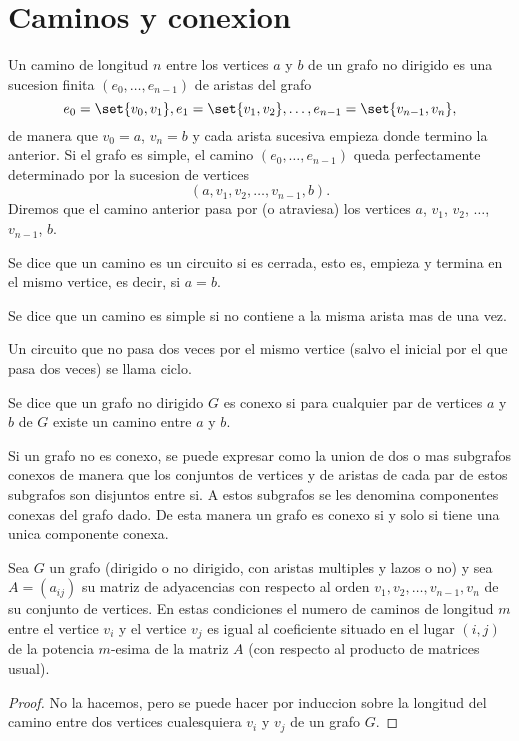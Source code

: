 \section{Caminos y conexion}
\begin{definition}[Camino]
	Un camino de longitud \(n \) entre los vertices \(a \) y \(b \) de un grafo no dirigido es una sucesion finita \((e_0, \ldots, e_{n-1})\) de aristas del grafo
	\[
		e_0 = \set{v_{0}, v_1}, e_1 = \set{v_1,v_2},\ldots,e_{n-1} = \set{v_{n-1}, v_n },
	\]
	de manera que \(v_0 = a \), \(v_n = b \) y cada arista sucesiva empieza donde termino la anterior. Si el grafo es simple, el camino \((e_0, \ldots, e_{n-1})\) queda perfectamente determinado por la sucesion de vertices
	\[
		(a,v_1,v_2,\ldots,v_{n-1}, b ).
	\]
	Diremos que el camino anterior pasa por (o atraviesa) los vertices
	\(a\), \(v_1\), \(v_2\), \(\ldots\), \(v_{n-1}\), \(b \).

	Se dice que un camino es un circuito si es cerrada, esto es, empieza y termina en el mismo vertice, es decir, si \(a = b\).

	Se dice que un camino es simple si no contiene a la misma arista mas de una vez.

	Un circuito que no pasa dos veces por el mismo vertice (salvo el inicial por el que pasa dos veces) se llama ciclo.
\end{definition}

\begin{definition}[Conexo]
	Se dice que un grafo no dirigido \(G \) es conexo si para cualquier par de vertices \(a \) y \(b \) de \(G \) existe un camino entre \(a \) y \(b \).
\end{definition}

Si un grafo no es conexo, se puede expresar como la union de dos o mas subgrafos conexos de manera que los conjuntos de vertices y de aristas de cada par de estos subgrafos son disjuntos entre si. A estos subgrafos se les denomina componentes conexas del grafo dado. De esta manera un grafo es conexo si y solo si tiene una unica componente conexa.

\begin{theorem}
	Sea \(G \) un grafo (dirigido o no dirigido, con aristas multiples y lazos o no) y sea \(A = (a_{ij })\) su matriz de adyacencias con respecto al orden \(v_1,v_2,\ldots,v_{n-1},v_n \) de su conjunto de vertices. En estas condiciones el numero de caminos de longitud \(m \) entre el vertice \(v_i \) y el vertice \(v_j \) es igual al coeficiente situado en el lugar \((i,j )\) de la potencia \(m\)-esima de la matriz \(A \) (con respecto al producto de matrices usual).
\end{theorem}
\begin{proof}
	No la hacemos, pero se puede hacer por induccion sobre la longitud del camino entre dos vertices cualesquiera \(v_i \) y \(v_j \) de un grafo \(G \).
\end{proof}

